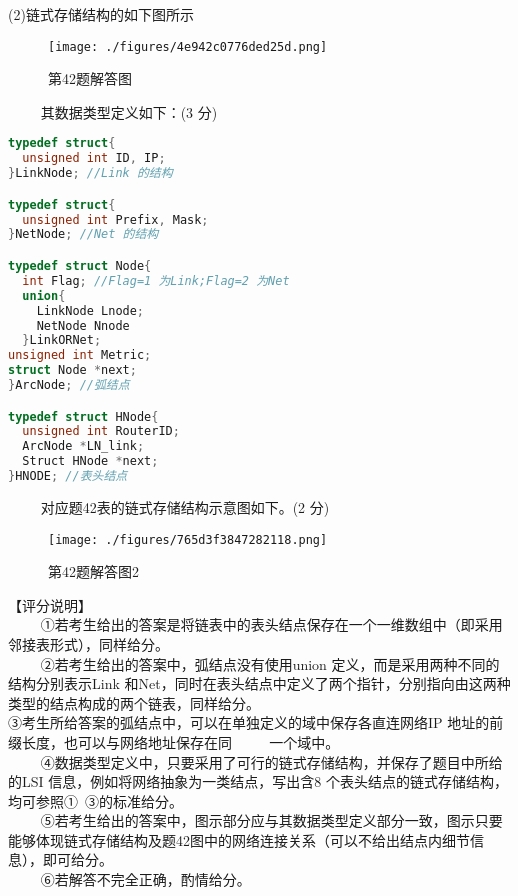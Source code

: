 (2)链式存储结构的如下图所示
\begin{figure}[ht]
\centering
\texttt{[image: ./figures/4e942c0776ded25d.png]}
\caption{第42题解答图} \label{fig_CSN14_7}
\end{figure}
$\qquad$ 其数据类型定义如下：(3 分) \\
\begin{lstlisting}[language=cpp]
typedef struct{
  unsigned int ID, IP;
}LinkNode; //Link 的结构

typedef struct{
  unsigned int Prefix, Mask;
}NetNode; //Net 的结构

typedef struct Node{
  int Flag; //Flag=1 为Link;Flag=2 为Net
  union{
    LinkNode Lnode;
    NetNode Nnode
  }LinkORNet;
unsigned int Metric;
struct Node *next;
}ArcNode; //弧结点

typedef struct HNode{
  unsigned int RouterID;
  ArcNode *LN_link;
  Struct HNode *next;
}HNODE; //表头结点
\end{lstlisting}
$\qquad$ 对应题42表的链式存储结构示意图如下。(2 分)
\begin{figure}[ht]
\centering
\texttt{[image: ./figures/765d3f3847282118.png]}
\caption{第42题解答图2} \label{fig_CSN14_8}
\end{figure}
【评分说明】 \\
$\qquad$ ①若考生给出的答案是将链表中的表头结点保存在一个一维数组中（即采用邻接表形式），同样给分。  \\
$\qquad$ ②若考生给出的答案中，弧结点没有使用union 定义，而是采用两种不同的结构分别表示Link 和Net，同时在表头结点中定义了两个指针，分别指向由这两种类型的结点构成的两个链表，同样给分。 \\
③考生所给答案的弧结点中，可以在单独定义的域中保存各直连网络IP 地址的前缀长度，也可以与网络地址保存在同 $\qquad$ 一个域中。 \\
$\qquad$ ④数据类型定义中，只要采用了可行的链式存储结构，并保存了题目中所给的LSI 信息，例如将网络抽象为一类结点，写出含8 个表头结点的链式存储结构，均可参照①~③的标准给分。 \\
$\qquad$ ⑤若考生给出的答案中，图示部分应与其数据类型定义部分一致，图示只要能够体现链式存储结构及题42图中的网络连接关系（可以不给出结点内细节信息），即可给分。 \\
$\qquad$ ⑥若解答不完全正确，酌情给分。

